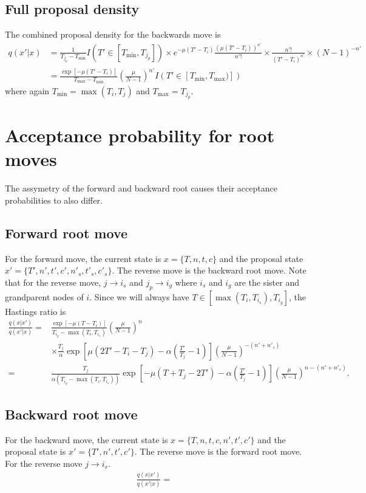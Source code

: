 \documentclass[a4paper,11pt]{article}
\begin{document}
\subsection{Full proposal density}

The combined proposal density for the backwards move is
\begin{align}
  q(x'|x) &= \frac{1}{T_{j_p}-T_{\min}}I(T'\in[T_{\min},T_{j_p}])
\times e^{-\mu(T'-T_i)}\frac{(\mu(T'-T_i))^{n'}}{n'!}
\times \frac{n'!}{(T'-T_i)^{n'}}
\times (N-1)^{-n'}\nonumber\\
&=\frac{\exp[-\mu(T'-T_i)]}{T_{\max}-T_{\min}}\left(\frac{\mu}{N-1}\right)^{n'}
I(T'\in[T_{\min},T_{\max})])
\end{align}
where again $T_{\min}=\max(T_i,T_j)$ and $T_{\max}=T_{j_p}$.

\section{Acceptance probability for root moves}

The assymetry of the forward and backward root causes their acceptance
probabilities to also differ.

\subsection{Forward root move}

For the forward move, the current state is $x=\{T,n,t,c\}$ and the
proposal state $x'=\{T',n',t',c',n'_s,t'_s,c'_s\}$. The reverse move
is the backward root move. Note that for the reverse move,
$j\rightarrow i_s$ and $j_p\rightarrow i_g$ where $i_s$ and $i_g$ are
the sister and grandparent nodes of $i$. Since we will always have
$T\in[\max(T_i,T_{i_s}),T_{i_g}]$, the Hastings ratio is
\begin{align}
  \frac{q(x|x')}{q(x'|x)}
=& \frac{\exp[-\mu(T-T_i)]}{T_{i_g}-\max(T_i,T_{i_s})}\left(\frac{\mu}{N-1}\right)^n\\
&\times
\frac{T_j}{\alpha}\exp\left[\mu(2T'-T_i-T_j)-\alpha\left(\frac{T'}{T_j}-1\right)\right]\left(\frac{\mu}{N-1}\right)^{-(n'+n'_s)}\nonumber\\
=& \frac{T_j}{\alpha(T_{i_g}-\max(T_i,T_{i_s}))}\exp\left[-\mu(T+T_j-2T')-\alpha\left(\frac{T'}{T_j}-1\right)\right]\left(\frac{\mu}{N-1}\right)^{n-(n'+n'_s)}.\nonumber
\end{align}

\subsection{Backward root move}

For the backward move, the current state is $x=\{T,n,t,c,n',t',c'\}$
and the proposal state is $x'=\{T',n',t',c'\}$. The reverse move is
the forward root move. For the reverse move $j\rightarrow
i_s$.
\begin{align}
  \frac{q(x|x')}{q(x'|x)}
=&
\end{align}
\end{document}
